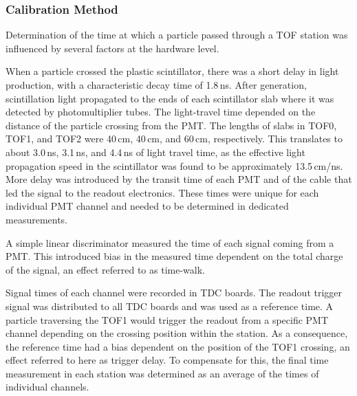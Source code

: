 \subsubsection{Calibration Method}

Determination of the time at which a particle passed through a TOF station was
influenced by several factors at the hardware level.

When a particle crossed the plastic scintillator, there was a short delay in light
production, with a characteristic decay time of 1.8\,ns.
After generation, scintillation light propagated to the ends of each
scintillator slab where it was detected by photomultiplier tubes. The
light-travel time depended on the distance of the particle crossing
from the PMT. The lengths of slabs in TOF0, TOF1, and TOF2 were 40\,cm,
40\,cm, and 60\,cm, respectively. This translates to about 3.0\,ns, 3.1\,ns,
and 4.4\,ns of light travel time, as the effective light
propagation speed in the scintillator was found to be approximately
13.5\,cm/ns.  More delay was introduced by the transit time of each PMT
and of the cable that led the signal to the readout electronics. These
times were unique for each individual PMT channel and needed to be
determined in dedicated measurements.

A simple linear discriminator measured the time of each signal coming from a PMT.
This introduced bias in the measured time dependent on the total charge of the signal, an effect referred to as time-walk.

Signal times of each channel were recorded in TDC boards.
The readout trigger signal was distributed to all TDC boards and was used as
a reference time.
A particle traversing the TOF1 would trigger the readout from a specific PMT channel depending on the crossing position within the station.
As a consequence, the reference time had a bias dependent on
the position of the TOF1 crossing, an effect referred to here as trigger
delay. To compensate for this, the final time measurement in each station was determined as an average of the times of individual channels.


